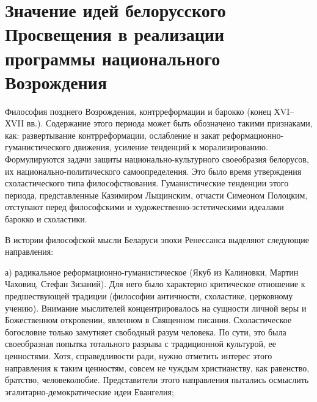 \section{Значение идей белорусского Просвещения в реализации программы национального Возрождения}
\label{sec:practice}

Философия позднего Возрождения, контрреформации и барокко (конец ХVI–ХVII вв.). Содержание этого периода может быть обозначено такими признаками, как: развертывание контрреформации, ослабление и закат реформационно-гуманистического движения, усиление тенденций к морализированию. Формулируются задачи защиты национально-культурного своеобразия белорусов, их национально-политического самоопределения. Это было время утверждения схоластического типа философствования. Гуманистические тенденции этого периода, представленные Казимиром Лыщинским, отчасти Симеоном Полоцким, отступают перед философскими и художественно-эстетическими идеалами барокко и схоластики.

В истории философской мысли Беларуси эпохи Ренессанса выделяют следующие направления:

а) радикальное реформационно-гуманистическое (Якуб из Калиновки, Мартин Чаховиц, Стефан Зизаний). Для него было характерно критическое отношение к предшествующей традиции (философии античности, схоластике, церковному учению). Внимание мыслителей концентрировалось на сущности личной веры и Божественном откровении, явленном в Священном писании. Схоластическое богословие только замутняет свободный разум человека. По сути, это была своеобразная попытка тотального разрыва с традиционной культурой, ее ценностями. Хотя, справедливости ради, нужно отметить интерес этого направления к таким ценностям, совсем не чуждым христианству, как равенство, братство, человеколюбие. Представители этого направления пытались осмыслить эгалитарно-демократические идеи Евангелия;

